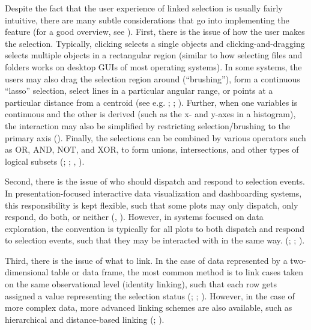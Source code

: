 \documentclass[
  openany]{book}
\theoremstyle{definition}
\theoremstyle{definition}
\theoremstyle{definition}
\theoremstyle{definition}
\theoremstyle{remark}
\begin{document}
Despite the fact that the user experience of linked selection is usually fairly intuitive, there are many subtle considerations that go into implementing the feature (for a good overview, see ). First, there is the issue of how the user makes the selection. Typically, clicking selects a single objects and clicking-and-dragging selects multiple objects in a rectangular region (similar to how selecting files and folders works on desktop GUIs of most operating systems). In some systems, the users may also drag the selection region around (``brushing''), form a continuous ``lasso'' selection, select lines in a particular angular range, or points at a particular distance from a centroid (see e.g. ; ; ). Further, when one variables is continuous and the other is derived (such as the x- and y-axes in a histogram), the interaction may also be simplified by restricting selection/brushing to the primary axis (). Finally, the selections can be combined by various operators such as OR, AND, NOT, and XOR, to form unions, intersections, and other types of logical subsets (; ; , ).

Second, there is the issue of who should dispatch and respond to selection events. In presentation-focused interactive data visualization and dashboarding systems, this responsibility is kept flexible, such that some plots may only dispatch, only respond, do both, or neither (, ). However, in systems focused on data exploration, the convention is typically for all plots to both dispatch and respond to selection events, such that they may be interacted with in the same way. (; ; ).

Third, there is the issue of what to link. In the case of data represented by a two-dimensional table or data frame, the most common method is to link cases taken on the same observational level (identity linking), such that each row gets assigned a value representing the selection status (; ; ). However, in the case of more complex data, more advanced linking schemes are also available, such as hierarchical and distance-based linking (; ).
\end{document}
